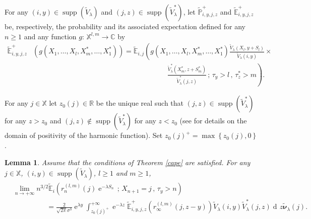 \documentclass[12pt]{amsart}
\newtheorem{lemma}[theorem]{Lemma}
\theoremstyle{definition}
\numberwithin{equation}{section}
\def\bb#1{\mathbb{#1}}
\def\tt#1{\tilde{#1}}
\def\tbs#1{\tilde{\boldsymbol{#1}}}
\def\tbb#1{\tilde{\mathbb{#1}}}
\def\geq{\geqslant}
\renewcommand\ll{\lambda}
\DeclareMathOperator{\dd}{d\!}
\DeclareMathOperator{\e}{e}
\DeclareMathOperator{\supp}{supp}
\begin{document}
For any $(i,y) \in \supp(\tt V_{\ll})$ and $(j,z) \in \supp(\tt V_{\ll}^*)$, let $\tbb P_{i,y,j,z}^+$ and $\tbb E_{i,y,j,z}^+$ be, respectively, the probability and its associated expectation defined for any $n \geq 1$ and any function $g$: $\bb X^{l,m} \to \bb C$ by
\begin{align}
\tbb E_{i,y,j,z}^+ &\left( g \left( X_1, \dots, X_l,X_m^*,\dots,X_1^* \right) \right) = \tbb E_{i,j} \left( g \left( X_1, \dots, X_l,X_m^*,\dots,X_1^* \right)  \frac{\tt V_{\ll} \left( X_l, y+S_l \right)}{\tt V_{\ll}(i,y)} \times \right. \nonumber \\
&\hspace{8cm} \left. \frac{\tt V_{\ll}^* \left( X_m^*, z+S_m^* \right)}{\tt V_{\ll}^*(j,z)} \,;\, \tau_y > l \,,\, \tau_z^* > m \right).
\label{theiere}
\end{align}

For any $j \in \bb X$ let $z_0(j) \in \bb R$ be the unique real such that $(j,z) \in \supp \left( \tt V_{\ll}^* \right)$ for any $z > z_0$ and $(j,z) \notin \supp \left( \tt V_{\ll}^* \right)$ for any $z < z_0$ (see \cite{grama_limit_2016-1} for details on the domain of positivity of the harmonic function). Set $z_0(j)^+=\max\left\{z_0(j), 0 \right\}$.

\begin{lemma} Assume that the conditions of Theorem \ref{cape} are satisfied.
\label{corbeau}
For any $j \in \bb X$, $(i,y) \in \supp\left( \tt V_{\ll} \right)$, $l \geq 1$ and $m \geq 1$,
\begin{align*}
&\lim_{n\to +\infty} n^{3/2} \tbb E_i \left( r_n^{(l,m)}(j) \e^{-\ll S_n} \,;\, X_{n+1} = j \,,\, \tau_y > n \right) \\
&\hspace{2cm} = \frac{2}{\sqrt{2\pi} \sigma^3} \e^{\ll y} \int_{z_0(j)^+}^{+\infty} \e^{-\ll z} \tbb E_{i,y,j,z}^+ \left( r_{\infty}^{(l,m)}(j,z-y) \right) \tt V_{\ll}(i,y) \tt V_{\ll}^*(j,z) \dd z \tbs \nu_{\ll}(j).
\end{align*}
\end{lemma}
\end{document}
